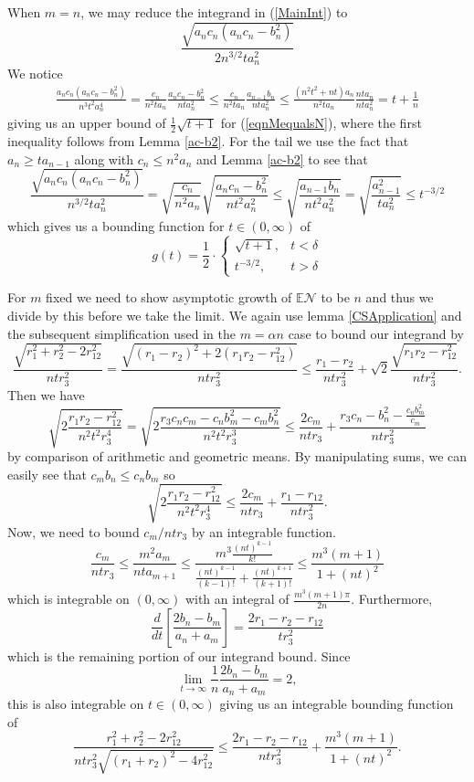 \documentclass[12pt]{amsart}
\theoremstyle{remark}
\begin{document}
When $m=n$, we may reduce the integrand in (\ref{MainInt}) to
\begin{equation}\label{eqnMequalsN}
\frac{\sqrt{a_nc_n(a_nc_n-b_n^2)}}{2n^{3/2}ta_n^2}
\end{equation}
We notice
\begin{align*}
\frac{a_nc_n(a_nc_n-b_n^2)}{n^3t^2a_n^4}=\frac{c_n}{n^2ta_n}\frac{a_nc_n-b_n^2}{nta_n^2}\le\frac{c_n}{n^2ta_n}\frac{a_{n-1}b_n}{nta_n^2}\le\frac{(n^2t^2+nt)a_n}{n^2ta_n}\frac{nta_n}{nta_n^2}=t+\frac{1}{n}
\end{align*}
giving us an upper bound of $\frac{1}{2}\sqrt{t+1}$ for (\ref{eqnMequalsN}), where the first inequality follows from Lemma \ref{ac-b2}.
For the tail we use the fact that $a_n\ge ta_{n-1}$ along with $c_n\le n^2a_n$ and Lemma \ref{ac-b2} to see that
\[\frac{\sqrt{a_nc_n(a_nc_n-b_n^2)}}{n^{3/2}ta_n^2}=\sqrt{\frac{c_n}{n^2a_n}}\sqrt{\frac{a_nc_n-b_n^2}{nt^2a_n^2}}\le\sqrt{\frac{a_{n-1}b_n}{nt^2a_n^2}}=\sqrt{\frac{a_{n-1}^2}{ta_n^2}}\le t^{-3/2}\]
which gives us a bounding function for $t\in(0,\infty)$ of
\[g(t)=\frac{1}{2}\cdot\left\{\begin{array}{ll}
\textstyle\sqrt{t+1},&t<\delta\\t^{-3/2},&t>\delta
\end{array}\right.\]

For $m$ fixed we need to show asymptotic growth of $\mathbb{E}\mathcal{N}$ to be $n$ and thus we divide by this before we take the limit.  We again use lemma \ref{CSApplication} and the subsequent simplification used in the $m=\alpha n$ case to bound our integrand by
\[\frac{\sqrt{r_1^2+r_2^2-2r_{12}^2}}{ntr_3^2}=\frac{\sqrt{(r_1-r_2)^2+2(r_1r_2-r_{12}^2)}}{ntr_3^2}\le\frac{r_1-r_2}{ntr_3^2}+\sqrt{2}\frac{\sqrt{r_1r_2-r_{12}^2}}{ntr_3^2}.\]
Then we have
\[\sqrt{2\frac{r_1r_2-r_{12}^2}{n^2t^2r_3^4}}=\sqrt{2\frac{r_3c_nc_m-c_nb_m^2-c_mb_n^2}{n^2t^2r_3^3}}\le\frac{2c_m}{ntr_3}+\frac{r_3c_n-b_n^2-\frac{c_nb_m^2}{c_m}}{ntr_3^2}\]by comparison of arithmetic and geometric means.  By manipulating sums, we can easily see that $c_mb_n\le c_nb_m$ so
\[\sqrt{2\frac{r_1r_2-r_{12}^2}{n^2t^2r_3^4}}\le\frac{2c_m}{ntr_3}+\frac{r_1-r_{12}}{ntr_3^2}.\]
Now, we need to bound $c_m/ntr_3$ by an integrable function.
\[\frac{c_m}{ntr_3}\le\frac{m^2a_m}{nta_{m+1}}\le\frac{m^3\frac{(nt)^{k-1}}{k!}}{\frac{(nt)^{k-1}}{(k-1)!}+\frac{(nt)^{k+1}}{(k+1)!}}\le\frac{m^3(m+1)}{1+(nt)^{2}}\]which is integrable on $(0,\infty)$ with an integral of $\frac{m^3(m+1)\pi}{2n}$.
Furthermore,
\[\frac{d}{dt}\left[\frac{2b_n-b_m}{a_n+a_m}\right]=\frac{2r_1-r_2-r_{12}}{tr_3^2}\]which is the remaining portion of our integrand bound.  Since
\[\lim_{t\rightarrow\infty}\frac{1}{n}\frac{2b_n-b_m}{a_n+a_m}=2,\] this is also integrable on $t\in(0,\infty)$ giving us an integrable bounding function of
\[\frac{r_1^2+r_2^2-2r_{12}^2}{ntr_3^2\sqrt{(r_1+r_2)^2-4r_{12}^2}}\le \frac{2r_1-r_2-r_{12}}{ntr_3^2}+\frac{m^3(m+1)}{1+(nt)^{2}}.\]
\end{document}
